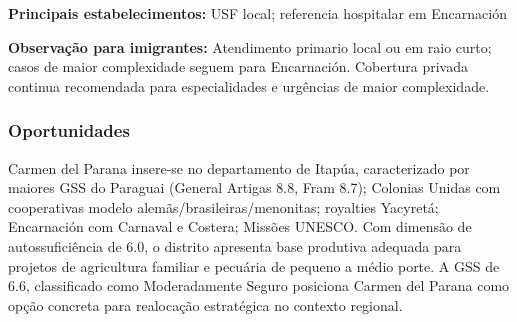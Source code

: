 \textbf{Principais estabelecimentos:} USF local; referencia hospitalar
em Encarnación

\textbf{Observação para imigrantes:} Atendimento primario local ou em
raio curto; casos de maior complexidade seguem para Encarnación.
Cobertura privada continua recomendada para especialidades e urgências
de maior complexidade.
\newpage

\subsubsection*{Oportunidades}\label{oport-carmen-del-parana-0707}
Carmen del Parana insere-se no departamento de Itapúa, caracterizado por maiores GSS do Paraguai (General Artigas 8.8, Fram 8.7); Colonias Unidas com cooperativas modelo alemãs/brasileiras/menonitas; royalties Yacyretá; Encarnación com Carnaval e Costera; Missões UNESCO. Com dimensão de autossuficiência de 6.0, o distrito apresenta base produtiva adequada para projetos de agricultura familiar e pecuária de pequeno a médio porte. A GSS de 6.6, classificado como Moderadamente Seguro posiciona Carmen del Parana como opção concreta para realocação estratégica no contexto regional.

